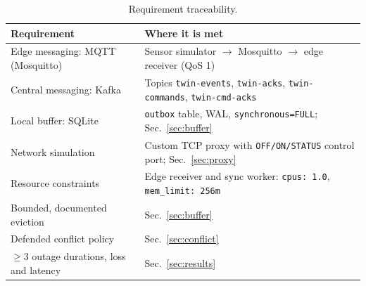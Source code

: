 \documentclass[11pt,a4paper]{article}
\begin{document}
\begin{table}[H]\centering\small
\caption{Requirement traceability.}
\begin{tabularx}{\textwidth}{>{\raggedright}p{4.1cm}X}
\toprule
Requirement & Where it is met\\\midrule
Edge messaging: MQTT (Mosquitto) & Sensor simulator $\to$ Mosquitto $\to$ edge receiver (QoS 1)\\
Central messaging: Kafka & Topics \texttt{twin-events}, \texttt{twin-acks}, \texttt{twin-commands}, \texttt{twin-cmd-acks}\\
Local buffer: SQLite & \texttt{outbox} table, WAL, \texttt{synchronous=FULL}; Sec.~\ref{sec:buffer}\\
Network simulation & Custom TCP proxy with \texttt{OFF/ON/STATUS} control port; Sec.~\ref{sec:proxy}\\
Resource constraints & Edge receiver and sync worker: \texttt{cpus: 1.0}, \texttt{mem\_limit: 256m}\\
Bounded, documented eviction & Sec.~\ref{sec:buffer}\\
Defended conflict policy & Sec.~\ref{sec:conflict}\\
$\geq3$ outage durations, loss and latency & Sec.~\ref{sec:results}\\\bottomrule
\end{tabularx}
\end{table}

\end{document}

